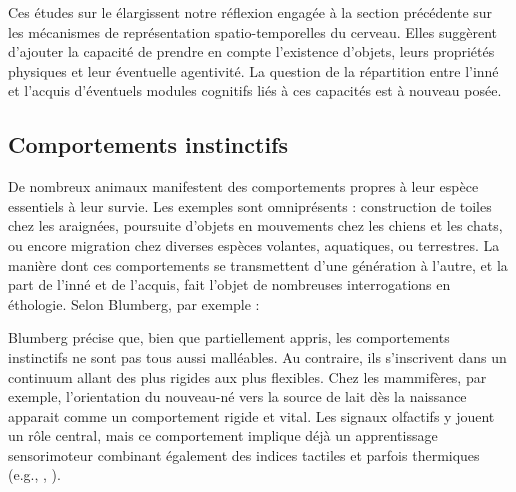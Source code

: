 Ces études sur le  élargissent notre réflexion engagée à la section précédente sur les mécanismes de représentation spatio-temporelles du cerveau. 
Elles suggèrent d'ajouter la capacité de prendre en compte l'existence d'objets, leurs propriétés physiques et leur éventuelle agentivité. 
La question de la répartition entre l'inné et l'acquis d'éventuels modules cognitifs liés à ces capacités est à nouveau posée. 


\subsection{Comportements instinctifs}

\noindent
De nombreux animaux manifestent des comportements propres à leur espèce essentiels à leur survie. 
Les exemples sont omniprésents : construction de toiles chez les araignées, poursuite d'objets en mouvements chez les chiens et les chats, ou encore migration chez diverses espèces volantes, aquatiques, ou terrestres. 
La manière dont ces comportements se transmettent d'une génération à l'autre, et la part de l'inné et de l'acquis, fait l'objet de nombreuses interrogations en éthologie. 
Selon Blumberg, par exemple : 


\begin{quote}
	\cite[p.~1]{blumberg_development_2017}	
\end{quote}

Blumberg précise que, bien que partiellement appris, les comportements instinctifs ne sont pas tous aussi malléables.
Au contraire, ils s'inscrivent dans un continuum allant des plus rigides aux plus flexibles. 
Chez les mammifères, par exemple, l'orientation du nouveau-né vers la source de lait dès la naissance apparait comme un comportement rigide et vital. 
Les signaux olfactifs y jouent un rôle central, mais ce comportement implique déjà un apprentissage sensorimoteur combinant également des indices tactiles et parfois thermiques (e.g., \cite{hym_newborn_2021}, \cite{alberts_experience_2012}). 


